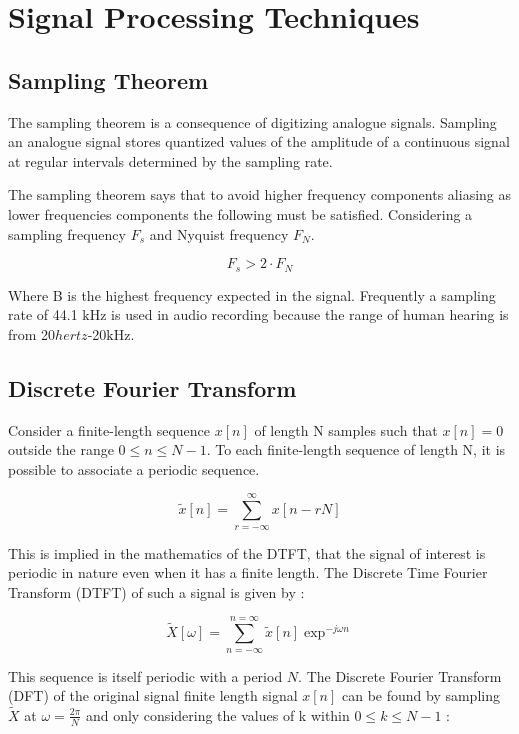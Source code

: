 \section{Signal Processing Techniques}
\subsection{Sampling Theorem}

The sampling theorem is a consequence of digitizing analogue signals. Sampling
an analogue signal stores quantized values of the amplitude of a continuous
signal at regular intervals determined by the sampling rate.

The sampling theorem says that to avoid higher frequency components aliasing as
lower frequencies components the following must be satisfied. Considering a
sampling frequency $F_{s}$ and Nyquist frequency $F_{N}$.

\begin{equation}
  F_{s} > 2\cdot F_{N}
\end{equation}

Where B is the highest frequency expected in the signal. Frequently a sampling
rate of 44.1 $\si{\kilo\hertz}$ is used in audio recording because the range of
human hearing is from 20$\si{hertz}$-20$\si{\kilo\hertz}$.

\subsection{Discrete Fourier Transform}

Consider a finite-length sequence $x[n]$ of length N samples such that $x[n] =
  0$ outside the range $0 \leq  n \leq N - 1$. To each finite-length sequence of
length N, it is possible to associate a periodic sequence.

\begin{equation}
  \tilde{x}[n] =\sum_{r=-\infty}^{\infty} x[n-r N]
\end{equation}

This is implied in the mathematics of the DTFT, that the signal of interest is
periodic in nature even when it has a finite length. The Discrete Time Fourier
Transform (DTFT) of such a signal is given by :

\begin{equation}
  \tilde{X}[\omega] =\sum_{n=-\infty}^{n=\infty} \tilde{x}[n] \exp^{-j \omega n }
\end{equation}

This sequence is itself periodic with a period $N$. The Discrete Fourier
Transform (DFT) of the original signal finite length signal $x[n]$ can be found
by sampling $\tilde{X}$ at $\omega=\frac{2 \pi}{N}$ and only considering the
values of k within $0 \leq  k \leq N - 1$ :

